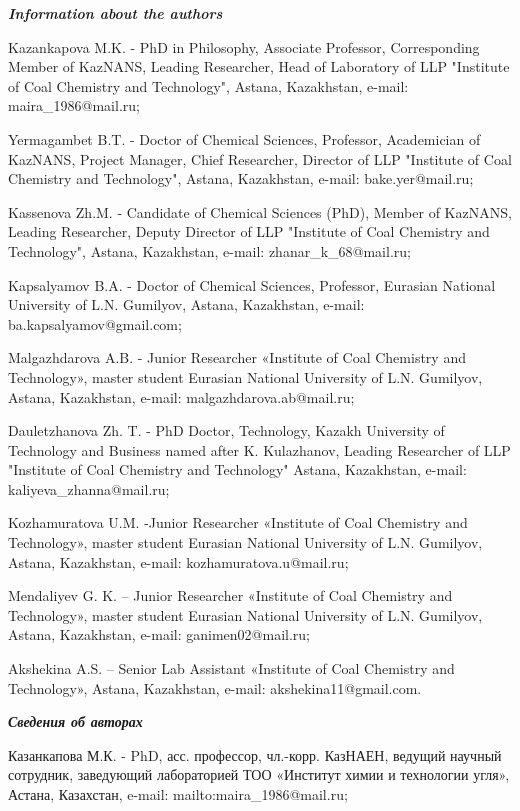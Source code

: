\begin{info}
\emph{{\bfseries Information about the authors}}

Kazankapova M.K. - PhD in Philosophy, Associate Professor, Corresponding
Member of KazNANS, Leading Researcher, Head of Laboratory of LLP
"Institute of Coal Chemistry and Technology", Astana, Kazakhstan,
e-mail: maira\_1986@mail.ru;

Yermagambet B.T. - Doctor of Chemical Sciences, Professor, Academician
of KazNANS, Project Manager, Chief Researcher, Director of LLP
"Institute of Coal Chemistry and Technology", Astana, Kazakhstan,
e-mail: bake.yer@mail.ru;

Kassenova Zh.M. - Candidate of Chemical Sciences (PhD), Member of
KazNANS, Leading Researcher, Deputy Director of LLP "Institute of Coal
Chemistry and Technology", Astana, Kazakhstan, e-mail:
zhanar\_k\_68@mail.ru;

Kapsalyamov B.A. - Doctor of Chemical Sciences, Professor, Eurasian
National University of L.N. Gumilyov, Astana, Kazakh\-stan, e-mail:
ba.kapsalyamov@gmail.com;

Malgazhdarova A.B. - Junior Researcher «Institute of Coal Chemistry and
Technology», master student Eurasian National University of L.N.
Gumilyov, Astana, Kazakhstan, e-mail: malgazhdarova.ab@mail.ru;

Dauletzhanova Zh. T. - PhD Doctor, Technology, Kazakh University of
Technology and Business named after K. Kulazhanov, Leading Researcher of
LLP "Institute of Coal Chemistry and Technology" Astana, Kazakhstan,
e-mail: kaliyeva\_zhanna@mail.ru;

Kozhamuratova U.M. -Junior Researcher «Institute of Coal Chemistry and
Technology», master student Eurasian National University of L.N.
Gumilyov, Astana, Kazakhstan, e-mail: kozhamuratova.u@mail.ru;

Mendaliyev G. K. -- Junior Researcher «Institute of Coal Chemistry and
Technology», master student Eurasian National University of L.N.
Gumilyov, Astana, Kazakhstan, e-mail: ganimen02@mail.ru;

Akshekina A.S. -- Senior Lab Assistant «Institute of Coal Chemistry and
Technology», Astana, Kazakhstan, e-mail: akshekina11@gmail.com.

\emph{{\bfseries Сведения об авторах}}

Казанкапова М.К. - PhD, асс. профессор, чл.-корр. КазНАЕН, ведущий
научный сотрудник, заведующий лабораторией ТОО «Институт химии и
технологии угля», Астана, Казахстан, e-mail:
mailto:maira\_1986@mail.ru;


\end{info}
